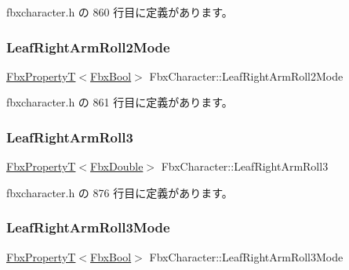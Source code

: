 fbxcharacter.\+h の 860 行目に定義があります。

\mbox{\label{class_fbx_character_ad9796935aff85739df826d3b6ed63287}} 
\subsubsection{\texorpdfstring{Leaf\+Right\+Arm\+Roll2\+Mode}{LeafRightArmRoll2Mode}}
{\footnotesize\ttfamily \hyperlink{class_fbx_property_t}{Fbx\+PropertyT}$<$\hyperlink{fbxtypes_8h_a92e0562b2fe33e76a242f498b362262e}{Fbx\+Bool}$>$ Fbx\+Character\+::\+Leaf\+Right\+Arm\+Roll2\+Mode}



 fbxcharacter.\+h の 861 行目に定義があります。

\mbox{\label{class_fbx_character_a162b785333125d08fd999c661036288e}} 
\subsubsection{\texorpdfstring{Leaf\+Right\+Arm\+Roll3}{LeafRightArmRoll3}}
{\footnotesize\ttfamily \hyperlink{class_fbx_property_t}{Fbx\+PropertyT}$<$\hyperlink{fbxtypes_8h_a171e72a1c46fc15c1a6c9c31948c1c5b}{Fbx\+Double}$>$ Fbx\+Character\+::\+Leaf\+Right\+Arm\+Roll3}



 fbxcharacter.\+h の 876 行目に定義があります。

\mbox{\label{class_fbx_character_a7cb8012eb30c350b2a5c1558e8b64dd1}} 
\subsubsection{\texorpdfstring{Leaf\+Right\+Arm\+Roll3\+Mode}{LeafRightArmRoll3Mode}}
{\footnotesize\ttfamily \hyperlink{class_fbx_property_t}{Fbx\+PropertyT}$<$\hyperlink{fbxtypes_8h_a92e0562b2fe33e76a242f498b362262e}{Fbx\+Bool}$>$ Fbx\+Character\+::\+Leaf\+Right\+Arm\+Roll3\+Mode}



